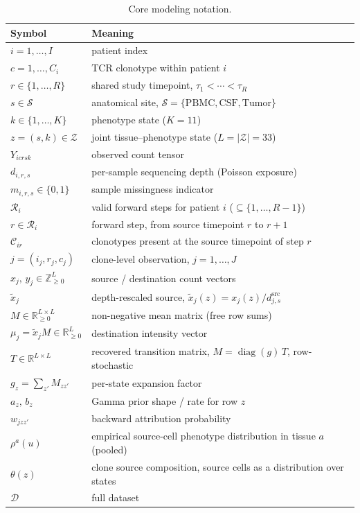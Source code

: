 \documentclass[11pt]{article}
\newcommand{\Znn}{\mathbb{Z}_{\geq 0}}            %
\newcommand{\Reals}{\mathbb{R}}
\newcommand{\Zsp}{\mathcal{Z}}                    %
\newcommand{\Ssp}{\mathcal{S}}                    %
\newcommand{\Csp}{\mathcal{C}}                    %
\newcommand{\Rsp}{\mathcal{R}}                    %
\newcommand{\Dsp}{\mathcal{D}}                    %
\newcommand{\dsrc}{d^{\mathrm{src}}}
\theoremstyle{definition}
\begin{document}
\begin{table}[h]
\centering
\renewcommand{\arraystretch}{1.25}
\begin{tabular}{@{}ll@{}}
\toprule
\textbf{Symbol} & \textbf{Meaning}\\
\midrule
$i = 1,\ldots,I$              & patient index\\
$c = 1,\ldots,C_i$           & TCR clonotype within patient $i$\\
$r \in \{1,\ldots,R\}$       & shared study timepoint, $\tau_1<\cdots<\tau_R$\\
$s \in \Ssp$                 & anatomical site, $\Ssp=\{\mathrm{PBMC},\mathrm{CSF},\mathrm{Tumor}\}$\\
$k \in \{1,\ldots,K\}$       & phenotype state ($K=11$)\\
$z = (s,k) \in \Zsp$         & joint tissue--phenotype state ($L=|\Zsp|=33$)\\
$Y_{icrsk}$                  & observed count tensor\\
$d_{i,r,s}$                  & per-sample sequencing depth (Poisson exposure)\\
$m_{i,r,s} \in \{0,1\}$      & sample missingness indicator\\
$\Rsp_i$                     & valid forward steps for patient $i$ ($\subseteq\{1,\ldots,R-1\}$)\\
$r \in \Rsp_i$               & forward step, from source timepoint $r$ to $r+1$\\
$\Csp_{ir}$                  & clonotypes present at the source timepoint of step $r$\\
$j = (i_j,r_j,c_j)$          & clone-level observation, $j=1,\ldots,J$\\
$x_j,\,y_j \in \Znn^{L}$     & source / destination count vectors\\
$\tilde{x}_j$                & depth-rescaled source, $\tilde{x}_j(z)=x_j(z)/\dsrc_{j,s}$\\
$M \in \Reals_{\geq 0}^{L\times L}$ & non-negative mean matrix (free row sums)\\
$\mu_j = \tilde{x}_j M \in \Reals_{\geq 0}^{L}$ & destination intensity vector\\
$T \in \Reals^{L\times L}$   & recovered transition matrix, $M=\operatorname{diag}(g)\,T$, row-stochastic\\
$g_z = \sum_{z'} M_{zz'}$    & per-state expansion factor\\
$a_z,\,b_z$                  & Gamma prior shape / rate for row $z$\\
$w_{jzz'}$                   & backward attribution probability\\
$\rho^a(u)$                  & empirical source-cell phenotype distribution in tissue $a$ (pooled)\\
$\theta(z)$                  & clone source composition, source cells as a distribution over states\\
$\Dsp$                       & full dataset\\
\bottomrule
\end{tabular}
\caption{Core modeling notation.}
\label{tab:notation}
\end{table}
\end{document}
